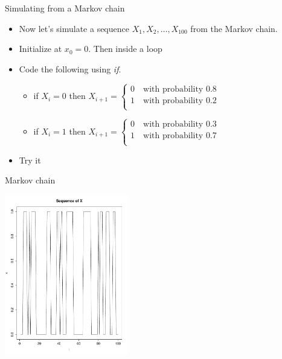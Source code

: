 \documentclass[10pt]{beamer}
\begin{document}
\begin{frame}{Simulating from a Markov chain}
\begin{itemize}
\item Now let's simulate a sequence $X_1,X_2,\ldots,X_{100}$ from the Markov chain.

\item Initialize at $x_0=0$.  Then inside a loop

\item Code the following using {\em if}.
\begin{itemize}
\item if $X_i=0$ then $X_{i+1}=\left\{
\begin{array}{c}
0\quad\mbox{with probability 0.8 }\\
1\quad\mbox{with probability 0.2 }\\
\end{array}
\right.$
\item if $X_i=1$ then $X_{i+1}=\left\{
\begin{array}{c}
0\quad\mbox{with probability 0.3 }\\
1\quad\mbox{with probability 0.7 }\\
\end{array}
\right.$
\end{itemize}

\item Try it
\end{itemize}
\end{frame}
\begin{frame}{Markov chain}
\begin{center}
\includegraphics[height=7cm]{./Pics/seqx.pdf}
\end{center}
\end{frame}
\end{document}
